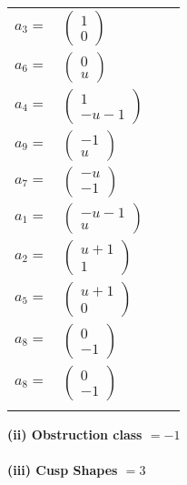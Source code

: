 \documentclass[1p]{elsarticle_modified}
\theoremstyle{definition}
\begin{document}
\begin{tabular}{m{7pt} m{180pt} m{7pt} m{180pt} }
\flushright $a_{3}=$&$\begin{pmatrix}1\\0\end{pmatrix}$ \\
\flushright $a_{6}=$&$\begin{pmatrix}0\\u\end{pmatrix}$ \\
\flushright $a_{4}=$&$\begin{pmatrix}1\\- u-1\end{pmatrix}$ \\
\flushright $a_{9}=$&$\begin{pmatrix}-1\\u\end{pmatrix}$ \\
\flushright $a_{7}=$&$\begin{pmatrix}- u\\-1\end{pmatrix}$ \\
\flushright $a_{1}=$&$\begin{pmatrix}- u-1\\u\end{pmatrix}$ \\
\flushright $a_{2}=$&$\begin{pmatrix}u+1\\1\end{pmatrix}$ \\
\flushright $a_{5}=$&$\begin{pmatrix}u+1\\0\end{pmatrix}$ \\
\flushright $a_{8}=$&$\begin{pmatrix}0\\-1\end{pmatrix}$\\ \flushright $a_{8}=$&$\begin{pmatrix}0\\-1\end{pmatrix}$\\&\end{tabular}
\flushleft \textbf{(ii) Obstruction class $= -1$}\\~\\
\flushleft \textbf{(iii) Cusp Shapes $= 3$}\\~\\
\end{document}
